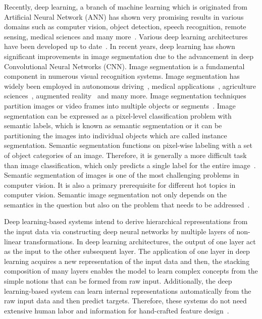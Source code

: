 Recently, deep learning, a branch of machine learning which is originated from Artificial Neural Network (ANN) has shown very promising results in various domains such as computer vision, object detection, speech recognition, remote sensing, medical sciences and many more~\cite{deng2014deep, mohanty2016using, zhang2020well, pashaei2020review}. Various deep learning architectures have been developed up to date~\cite{zhao2019deep}. In recent years, deep learning has shown significant improvements in image segmentation due to the advancement in deep Convolutional Neural Networks (CNN). Image segmentation is a fundamental component in numerous visual recognition systems. Image segmentation has widely been employed in autonomous driving~\cite{zhang2013understanding, cordts2016cityscapes, ros2016synthia, li2018real}, medical applications~\cite{taghanaki2020deep}, agriculture sciences~\cite{milioto2018real}, augmented reality~\cite{miksik2015semantic} and many more. Image segmentation techniques partition images or video frames into multiple objects or segments~\cite{szeliski2010computer}. Image segmentation can be expressed as a pixel-level classification problem with semantic labels, which is known as semantic segmentation or it can be partitioning the images into individual objects which are called instance segmentation. Semantic segmentation functions on pixel-wise labeling with a set of object categories of an image. Therefore, it is generally a more difficult task than image classification, which only predicts a single label for the entire image~\cite{minaee2020image}. Semantic segmentation of images is one of the most challenging problems in computer vision. It is also a primary prerequisite for different hot topics in computer vision. Semantic image segmentation not only depends on the semantics in the question but also on the problem that needs to be addressed~\cite{ghosh2019understanding}.

Deep learning-based systems intend to derive hierarchical representations from the input data via constructing deep neural networks by multiple layers of non-linear transformations. In deep learning architectures, the output of one layer act as the input to the other subsequent layer. The application of one layer in deep learning acquires a new representation of the input data and then, the stacking composition of many layers enables the model to learn complex concepts from the simple notions that can be formed from raw input. Additionally, the deep learning-based system can learn internal representations automatically from the raw input data and then predict targets. Therefore, these systems do not need extensive human labor and information for hand-crafted feature design~\cite{zhao2019deep, yuan2020machine}.

